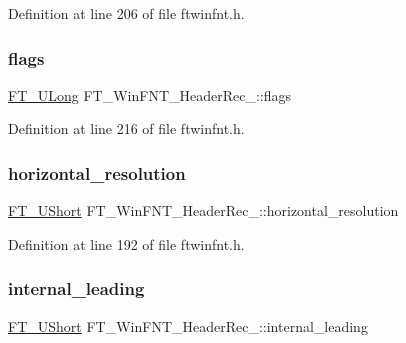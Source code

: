 Definition at line 206 of file ftwinfnt.\+h.

\mbox{\label{struct_f_t___win_f_n_t___header_rec___ac3230b8c51250b5c1e48c8e38c44d6f6}} 
\subsubsection{\texorpdfstring{flags}{flags}}
{\footnotesize\ttfamily \mbox{\hyperlink{fttypes_8h_a4fac88bdba78eb76b505efa6e4fbf3f5}{F\+T\+\_\+\+U\+Long}} F\+T\+\_\+\+Win\+F\+N\+T\+\_\+\+Header\+Rec\+\_\+\+::flags}



Definition at line 216 of file ftwinfnt.\+h.

\mbox{\label{struct_f_t___win_f_n_t___header_rec___a0adc07f0f285c8c2350c0078d71ace9a}} 
\subsubsection{\texorpdfstring{horizontal\_resolution}{horizontal\_resolution}}
{\footnotesize\ttfamily \mbox{\hyperlink{fttypes_8h_a937f6c17cf5ffd09086d8610c37b9f58}{F\+T\+\_\+\+U\+Short}} F\+T\+\_\+\+Win\+F\+N\+T\+\_\+\+Header\+Rec\+\_\+\+::horizontal\+\_\+resolution}



Definition at line 192 of file ftwinfnt.\+h.

\mbox{\label{struct_f_t___win_f_n_t___header_rec___a4d0826bf847581def355ca51d7c4ef00}} 
\subsubsection{\texorpdfstring{internal\_leading}{internal\_leading}}
{\footnotesize\ttfamily \mbox{\hyperlink{fttypes_8h_a937f6c17cf5ffd09086d8610c37b9f58}{F\+T\+\_\+\+U\+Short}} F\+T\+\_\+\+Win\+F\+N\+T\+\_\+\+Header\+Rec\+\_\+\+::internal\+\_\+leading}



